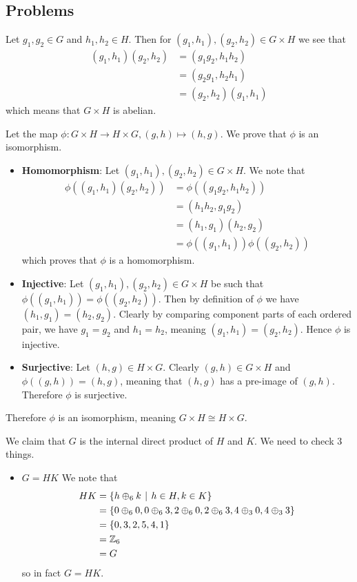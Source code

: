 \subsection*{Problems}
\begin{questions}
    \item Let $g_1, g_2 \in G$ and $h_1, h_2 \in H$. Then for $(g_1, h_1), (g_2, h_2) \in G\times H$ we see that
    \begin{align*}
        (g_1, h_1)(g_2, h_2) &= (g_1g_2, h_1h_2)\\
        &= (g_2g_1, h_2h_1)\\
        &= (g_2,h_2)(g_1,h_1)
    \end{align*}
    which means that $G \times H$ is abelian.

    \item Let the map $\phi: G\times H \to H \times G, (g, h) \mapsto (h, g)$. We prove that $\phi$ is an isomorphism.
    \begin{itemize}
        \item \textbf{Homomorphism}: Let $(g_1, h_1), (g_2, h_2) \in G \times H$. We note that
        \begin{align*}
            \phi((g_1, h_1)(g_2, h_2)) &= \phi((g_1g_2, h_1h_2))\\
            &= (h_1h_2, g_1g_2)\\
            &= (h_1, g_1)(h_2, g_2)\\
            &= \phi((g_1, h_1))\phi((g_2, h_2))
        \end{align*}
        which proves that $\phi$ is a homomorphism.
        \item \textbf{Injective}: Let $(g_1, h_1), (g_2, h_2) \in G \times H$ be such that $\phi((g_1, h_1)) = \phi((g_2, h_2))$. Then by definition of $\phi$ we have $(h_1, g_1) = (h_2, g_2)$. Clearly by comparing component parts of each ordered pair, we have $g_1 = g_2$ and $h_1 = h_2$, meaning $(g_1, h_1) = (g_2, h_2)$. Hence $\phi$ is injective.
        \item \textbf{Surjective}: Let $(h, g) \in H \times G$. Clearly $(g, h) \in G \times H$ and $\phi((g, h)) = (h, g)$, meaning that $(h, g)$ has a pre-image of $(g, h)$. Therefore $\phi$ is surjective.
    \end{itemize}
    Therefore $\phi$ is an isomorphism, meaning $G \times H \cong H \times G$.

    \item We claim that $G$ is the internal direct product of $H$ and $K$. We need to check 3 things.
    \begin{itemize}
        \item $\boxed{G = HK}$ We note that
        \begin{align*}
            HK &= \{h \oplus_6 k \vert h \in H, k \in K\}\\
            &= \{0 \oplus_6 0, 0 \oplus_6 3, 2 \oplus_6 0, 2 \oplus_6 3, 4 \oplus_3 0, 4 \oplus_3 3\}\\
            &= \{0, 3, 2, 5, 4, 1\}\\
            &= \Z_6\\
            &= G
        \end{align*}
        so in fact $G = HK$.


\end{itemize}
\end{questions}
